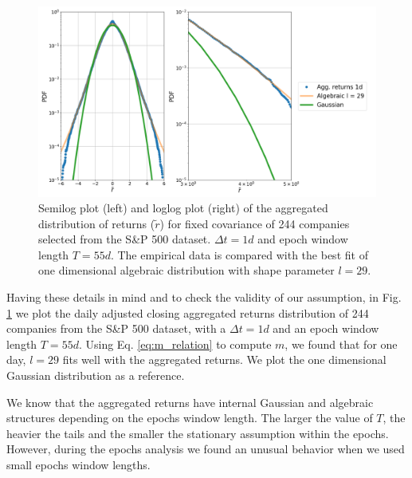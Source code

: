 \begin{figure}[htbp]
    \centering
    \includegraphics[width=0.7\columnwidth]
    {figures/05_algebraic_agg_returns_short_epoch.png}
    \caption{Semilog plot (left) and loglog plot (right) of the aggregated
             distribution of returns ($\tilde{r}$) for fixed 
             covariance of 244 companies selected from the S\&P 500 
             dataset. $\Delta t = 1d$ and epoch window length $T=55d$. The
             empirical data is compared with the best fit of one
             dimensional algebraic distribution with shape parameter 
             $l=29$.}
    \label{fig:algebraic_agg_returns_epoch}
\end{figure}

Having these details in mind and to check the validity of our assumption,
in Fig. \ref{fig:algebraic_agg_returns_epoch} we plot the daily adjusted
closing aggregated returns distribution of 244 companies from the S\&P 500
dataset, with a $\Delta t = 1d$ and an epoch window length $T = 55d$. Using
Eq. \ref{eq:m_relation} to compute $m$, we found that for one day, $l = 29$
fits well with the aggregated returns. We plot the one dimensional Gaussian
distribution as a reference.

We know that the aggregated returns have internal Gaussian and algebraic
structures depending on the epochs window length. The larger the value of
$T$, the heavier the tails and the smaller the stationary assumption 
within the epochs. However, during the epochs analysis we found an unusual
behavior when we used small epochs window lengths.


